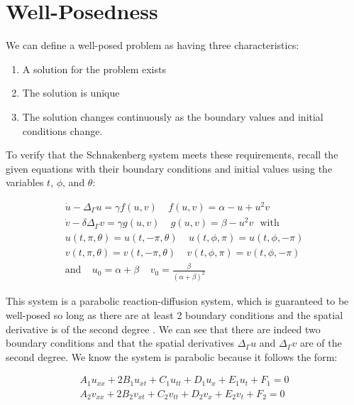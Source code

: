 \documentclass[12pt]{article}
\begin{document}
\section{Well-Posedness}

We can define a well-posed problem as having three characteristics:

\begin{enumerate}
	\item A solution for the problem exists
	\item The solution is unique
	\item The solution changes continuously as the boundary values and initial conditions change.
\end{enumerate}

To verify that the Schnakenberg system meets these requirements, recall the given equations with their boundary conditions and initial values using the variables $t$, $\phi$, and $\theta$:

\begin{equation}
	\begin{aligned}
		\dot{u} - \Delta_\Gamma u = \gamma f(u,v) ~~~~~ f(u,v) = \alpha - u + u^2v ~~~\\
		\dot{v} - \delta\Delta_\Gamma v = \gamma g(u, v) ~~~~~ g(u, v) = \beta - u^2v ~~~ \text{with}\\
		u(t,\pi, \theta) = u(t, -\pi, \theta) ~~~~~ u(t, \phi, \pi) = u(t, \phi, -\pi) \\
		v(t,\pi, \theta) = v(t, -\pi, \theta) ~~~~~ v(t, \phi, \pi) = v(t, \phi, -\pi)	\\
		\text{and} ~~~~~ u_0 = \alpha + \beta ~~~~~ v_0 = \frac{\beta}{(\alpha+\beta)^2}~~~~~~
	\end{aligned}
\end{equation}

This system is a parabolic reaction-diffusion system, which is guaranteed to be well-posed so long as there are at least 2 boundary conditions and the spatial derivative is of the second degree \cite{}. We can see that there are indeed two boundary conditions and that the spatial derivatives $\Delta_\Gamma u$ and $\Delta_\Gamma v$ are of the second degree. We know the system is parabolic because it follows the form:

\begin{equation}
	\begin{aligned}
		A_1u_{xx} + 2B_1u_{xt} + C_1u_{tt} + D_1u_x + E_1u_t + F_1 = 0 \\
		A_2v_{xx} + 2B_2v_{xt} + C_2v_{tt} + D_2v_x + E_2v_t + F_2 = 0
	\end{aligned}
\end{equation}
\end{document}
